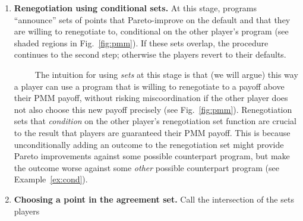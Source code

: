 \documentclass[sigconf]{aamas}
\theoremstyle{definition}
\begin{document}
\begin{enumerate}
    \item \textbf{Renegotiation
    using conditional sets.} 
    At this stage, programs “announce” sets of points that Pareto-improve on the default and that they are willing to renegotiate to,
    conditional on the other player's program (see shaded regions in Fig.~\ref{fig:pmm}).
    If these sets overlap, the procedure
    continues to the second step; 
    otherwise the players revert to their 
    defaults.
    
    \ \ \ \ \  The intuition for using
    \textit{sets} at
    this stage is that (we will argue)
    this way a player can use
    a program that is willing to 
    renegotiate to
    a payoff 
    above their PMM payoff,
    without risking
    miscoordination
    if the other player
    does not also choose
    this new payoff
    precisely (see Fig.~\ref{fig:pmm}).
    Renegotiation sets 
    that \textit{condition} on 
    the other player's renegotiation
    set function
    are
    crucial
    to the result
    that players are guaranteed
    their PMM payoff.
    This is 
    because unconditionally 
    adding an outcome to the
    renegotiation set might
    provide Pareto improvements against some possible counterpart program,
    but
    make the outcome 
    worse
    against some \textit{other} possible counterpart program
    (see Example~\ref{ex:cond}).
    \item \textbf{Choosing a point in the agreement set.}
    Call the intersection of the sets players

\end{enumerate}
\end{document}
